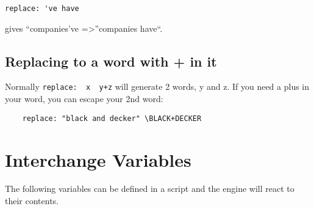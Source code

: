 \documentclass[]{article}
\begin{document}
\begin{verbatim}
replace: 've have
\end{verbatim}

gives ``companies've =\textgreater{}''companies have``.

\subsection{Replacing to a word with + in
it}\label{replacing-to-a-word-with-in-it}

Normally \texttt{replace:\ \ x\ \ y+z} will generate 2 words, y and z.
If you need a plus in your word, you can escape your 2nd word:

\begin{verbatim}
    replace: "black and decker" \BLACK+DECKER
\end{verbatim}

\section{Interchange Variables}\label{interchange-variables}

The following variables can be defined in a script and the engine will
react to their contents.
\end{document}
